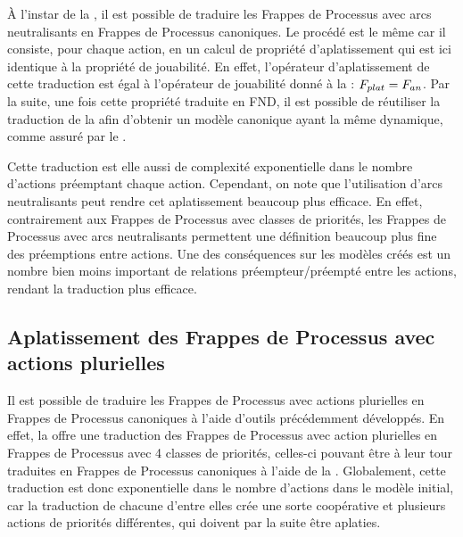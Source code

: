 À l'instar de la , il est possible de traduire les Frappes de Processus
avec arcs neutralisants en Frappes de Processus canoniques.
Le procédé est le même car il consiste, pour chaque action,
en un calcul de propriété d'aplatissement
qui est ici identique à la propriété de jouabilité.
En effet, l'opérateur d'aplatissement de cette traduction est égal à l'opérateur de jouabilité
donné à la  : $F_{plat} = F_{an}$.
Par la suite, une fois cette propriété traduite en FND, il est possible de réutiliser
la traduction de la  afin d'obtenir un modèle canonique
ayant la même dynamique, comme assuré par le .

Cette traduction est elle aussi de complexité exponentielle dans le nombre d'actions
préemptant chaque action.
Cependant, on note que l'utilisation d'arcs neutralisants peut rendre cet aplatissement
beaucoup plus efficace.
En effet, contrairement aux Frappes de Processus avec classes de priorités,
les Frappes de Processus avec arcs neutralisants permettent une définition beaucoup plus fine
des préemptions entre actions.
Une des conséquences sur les modèles créés est un nombre bien moins important de relations
préempteur/préempté entre les actions, rendant la traduction plus efficace.



\subsection{Aplatissement des Frappes de Processus avec actions plurielles}

Il est possible de traduire les Frappes de Processus avec actions plurielles
en Frappes de Processus canoniques à l'aide d'outils précédemment développés.
En effet, la  offre une traduction des Frappes de Processus avec action
plurielles
en Frappes de Processus avec 4 classes de priorités, celles-ci pouvant être à leur tour traduites
en Frappes de Processus canoniques à l'aide de la .
Globalement, cette traduction est donc exponentielle dans le nombre d'actions dans le modèle
initial, car la traduction de chacune d'entre elles crée une sorte coopérative et plusieurs
actions de priorités différentes, qui doivent par la suite être aplaties.




